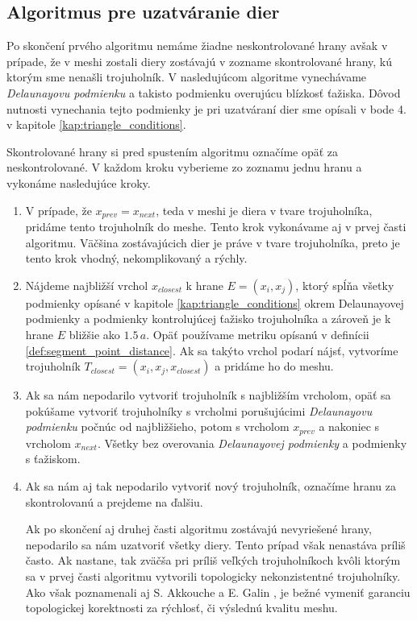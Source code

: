 \subsection{Algoritmus pre uzatváranie dier}

Po skončení prvého algoritmu nemáme žiadne neskontrolované hrany avšak v prípade, že v meshi zostali 
diery zostávajú v zozname skontrolované hrany, kú ktorým sme nenašli trojuholník. V nasledujúcom 
algoritme vynechávame \textit{Delaunayovu podmienku} a takisto podmienku overujúcu blízkosť ťažiska. 
Dôvod nutnosti vynechania tejto podmienky je pri uzatváraní dier sme opísali v bode 4. v kapitole 
\ref{kap:triangle_conditions}.

Skontrolované hrany si pred spustením algoritmu označíme opäť za neskontrolované. V každom kroku vyberieme
zo zoznamu jednu hranu a vykonáme nasledujúce kroky.
\begin{enumerate}
    \item{
        V prípade, že $x_{prev} = x_{next}$, teda v meshi je diera v tvare trojuholníka, pridáme tento 
        trojuholník do meshe. Tento krok vykonávame aj v prvej časti algoritmu. Väčšina zostávajúcich
        dier je práve v tvare trojuholníka, preto je tento krok vhodný, nekomplikovaný a rýchly.
    }
    \item{
        Nájdeme najbližší vrchol $x_{closest}$ k hrane $E = (x_i, x_j)$, ktorý spĺňa všetky podmienky 
        opísané v kapitole \ref{kap:triangle_conditions} okrem Delaunayovej podmienky a podmienky 
        kontrolujúcej ťažisko trojuholníka a zároveň je k hrane $E$ bližšie ako $1.5 \, a$. 
        Opäť používame metriku 
        opísanú v definícii \ref{def:segment_point_distance}. Ak sa takýto vrchol podarí nájsť, 
        vytvoríme trojuholník $T_{closest} = (x_i, x_j, x_{closest})$ a pridáme ho do meshu.
    }
    \item{
        Ak sa nám nepodarilo vytvoriť trojuholník s najbližším vrcholom, opäť sa pokúšame vytvoriť 
        trojuholníky s vrcholmi porušujúcimi \textit{Delaunayovu podmienku} počnúc od najbližšieho, 
        potom s vrcholom $x_{prev}$
        a nakoniec s vrcholom $x_{next}$. Všetky bez overovania \textit{Delaunayovej podmienky} a 
        podmienky s ťažiskom.
    }
    \item{
        Ak sa nám aj tak nepodarilo vytvoriť nový trojuholník, označíme hranu za skontrolovanú a prejdeme
        na ďalšiu.
    }
    
    Ak po skončení aj druhej časti algoritmu zostávajú nevyriešené hrany, nepodarilo sa nám 
    uzatvoriť všetky diery. Tento prípad však nenastáva príliš často. Ak nastane, tak zväčša pri 
    príliš veľkých trojuholníkoch kvôli ktorým sa v prvej časti algoritmu vytvorili topologicky
    nekonzistentné trojuholníky. Ako však poznamenali aj S. Akkouche a E. Galin 
    \cite{akkouche2001adaptive}, je bežné vymeniť garanciu topologickej korektnosti za rýchlosť,
    či výslednú kvalitu meshu. 
\end{enumerate}

